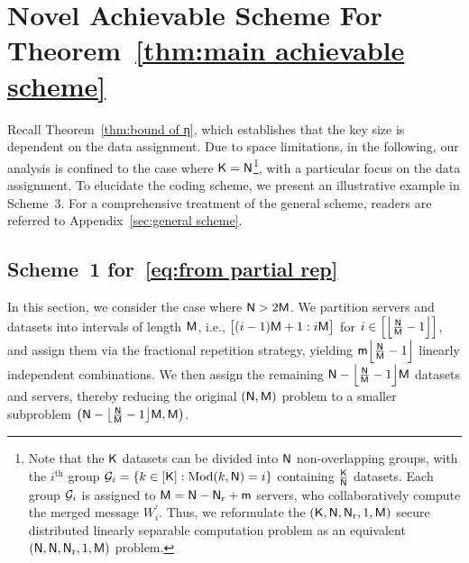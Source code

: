 \documentclass[conference,letterpaper]{IEEEtran}
\begin{document}
\section{Novel Achievable Scheme For Theorem~\ref{thm:main achievable scheme}}
\label{sec:Achievable coding scheme}

Recall Theorem~\ref{thm:bound of η}, which establishes that the key size is dependent on the data assignment. Due to space limitations, in the following, our analysis is confined to the case where ${\sf K} = {\sf N}$\footnote{Note that the ${\sf K}$ datasets can be divided into ${\sf N}$ non-overlapping groups, with the $i^{\text{th}}$ group ${\cal G}_i = \{k \in [{\sf K}]: \text{Mod}(k,{\sf N}) = i\}$ containing $\frac{{\sf K}}{{\sf N}}$ datasets. Each group ${\cal G}_i$ is assigned to ${\sf M} = {\sf N} - {\sf N}_{\rm r} + {\sf m}$ servers, who collaboratively compute the merged message $W^{\prime}_i$. Thus, we reformulate the $({\sf K}, {\sf N}, {\sf N}_{\rm r}, 1, {\sf M})$ secure distributed linearly separable computation problem as an equivalent $({\sf N}, {\sf N}, {\sf N}_{\rm r}, 1, {\sf M})$ problem.}, with a particular focus on the data assignment. To elucidate the coding scheme, we present an illustrative example in Scheme~3. For a comprehensive treatment of the general scheme, readers are referred to Appendix~\ref{sec:general scheme}.

\subsection{\texorpdfstring{Scheme~1 for~\eqref{eq:from partial rep}}{Scheme 1 for Eq. (X)}}
\label{sub:partial rep}
In this section, we consider the case where ${\sf N} > 2{\sf M}$. We partition servers and datasets into intervals of length \({\sf M}\), i.e., \(\bigl[(i-1){\sf M} + 1 : i{\sf M}\bigr]\) for \(i \in \Bigl[\Bigl\lfloor \frac{{\sf N}}{{\sf M}} - 1 \Bigr\rfloor\Bigr]\), and assign them via the fractional repetition strategy, yielding \({\sf m} \Bigl\lfloor \frac{{\sf N}}{{\sf M}} - 1 \Bigr\rfloor\) linearly independent combinations. We then assign the remaining \({\sf N} - \Bigl\lfloor \frac{{\sf N}}{{\sf M}} - 1 \Bigr\rfloor {\sf M}\) datasets and servers, thereby reducing the original \(({\sf N}, {\sf M})\) problem to a smaller subproblem \(\bigl({\sf N} - \bigl\lfloor \tfrac{{\sf N}}{{\sf M}} - 1 \bigr\rfloor {\sf M}, {\sf M}\bigr)\).
\end{document}

